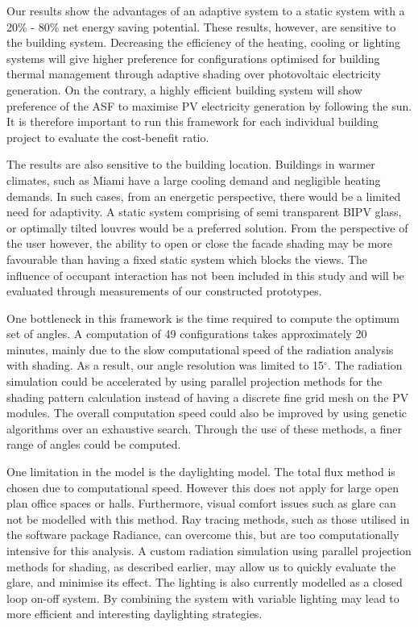 
Our results show the advantages of an adaptive system to a static system with a 20\% - 80\% net energy saving potential. These results, however, are sensitive to the building system. Decreasing the efficiency of the heating, cooling or lighting systems will give higher preference for configurations optimised for building thermal management through adaptive shading over photovoltaic electricity generation. On the contrary, a highly efficient building system will show preference of the ASF to maximise PV electricity generation by following the sun. It is therefore important to run this framework for each individual building project to evaluate the cost-benefit ratio.

The results are also sensitive to the building location. Buildings in warmer climates, such as Miami have a large cooling demand and negligible heating demands. In such cases, from an energetic perspective, there would be a limited need for adaptivity. A static system comprising of semi transparent BIPV glass, or optimally tilted louvres would be a preferred solution. From the perspective of the user however, the ability to open or close the facade shading may be more favourable than having a fixed static system which blocks the views. The influence of occupant interaction has not been included in this study and will be evaluated through measurements of our constructed prototypes.

One bottleneck in this framework is the time required to compute the optimum set of angles. A computation of 49 configurations takes approximately 20 minutes, mainly due to the slow computational speed of the radiation analysis with shading. As a result, our angle resolution was limited to 15$^{\circ}$. The radiation simulation could be accelerated by using parallel projection methods for the shading pattern calculation instead of having a discrete fine grid mesh on the PV modules. The overall computation speed could also be improved by using genetic algorithms over an exhaustive search. Through the use of these methods, a finer range of angles could be computed. 

One limitation in the model is the daylighting model. The total flux method is chosen due to computational speed. However this does not apply for large open plan office spaces or halls. Furthermore, visual comfort issues such as glare can not be modelled with this method. Ray tracing methods, such as those utilised in the software package Radiance, can overcome this, but are too computationally intensive for this analysis. A custom radiation simulation using parallel projection methods for shading, as described earlier, may allow us to quickly evaluate the glare, and minimise its effect. The lighting is also currently modelled as a closed loop on-off system. By combining the system with variable lighting may lead to more efficient and interesting daylighting strategies. 


